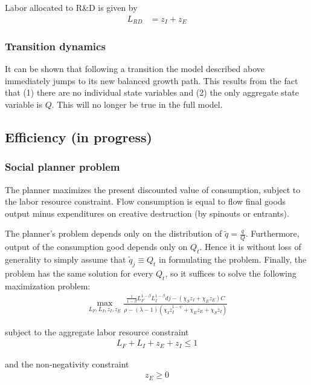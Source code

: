 \documentclass[11pt,english]{article}
\theoremstyle{remark}
\begin{document}
Labor allocated to R\&D is given by
\begin{align} 
	L_{RD} &= z_I + z_E \label{simplified_RDlabor_aggregation}
\end{align}



\subsubsection{Transition dynamics}

It can be shown that following a transition the model described above immediately jumps to its new balanced growth path. This results from the fact that (1) there are no individual state variables and (2) the only aggregate state variable is $Q$. This will no longer be true in the full model.

\subsection{Efficiency (in progress)}

\subsubsection{Social planner problem}

The planner maximizes the present discounted value of consumption, subject to the labor resource constraint. Flow consumption is equal to flow final goods output minus expenditures on creative destruction (by spinouts or entrants).  

The planner's problem depends only on the distribution of $\tilde{q} = \frac{q}{Q}$. Furthermore, output of the consumption good depends only on $Q_t$. Hence it is without loss of generality to simply assume that $\tilde{q}_j \equiv Q_t$ in formulating the problem. Finally, the problem has the same solution for every $Q_t$, so it suffices to solve the following maximization problem:
\begin{align*}
\max_{L_F,L_I,z_I,z_E} \frac{\frac{1}{1-\beta} L_F^{1-\beta} L_I^{1-\beta} dj - (\chi_S z_I + \chi_E z_E) C}{\rho - (\lambda-1)(\chi_I z_I^{1-\psi} + \chi_E z_E + \chi_S z_I)} 
\end{align*}

subject to the aggregate labor resource constraint
\begin{align*}
L_F + L_I + z_E + z_I \le 1
\end{align*}

and the non-negativity constraint
\begin{align*}
	z_E \ge 0
\end{align*}
\end{document}
